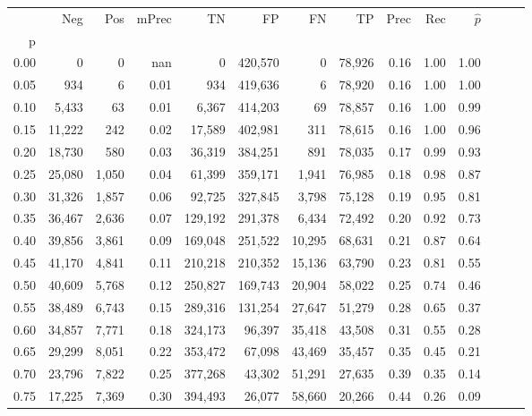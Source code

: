 \begin{tabular}{rrrrrrrrrrrrrr}
\toprule
{} &     Neg &    Pos & mPrec &       TN &       FP &      FN &      TP &  Prec &   Rec & $\hat{p}$ \\
p    &         &        &       &          &          &         &         &       &       &           \\
\midrule
0.00 &       0 &      0 &   nan &        0 &  420,570 &       0 &  78,926 &  0.16 &  1.00 &      1.00 \\
0.05 &     934 &      6 &  0.01 &      934 &  419,636 &       6 &  78,920 &  0.16 &  1.00 &      1.00 \\
0.10 &   5,433 &     63 &  0.01 &    6,367 &  414,203 &      69 &  78,857 &  0.16 &  1.00 &      0.99 \\
0.15 &  11,222 &    242 &  0.02 &   17,589 &  402,981 &     311 &  78,615 &  0.16 &  1.00 &      0.96 \\
0.20 &  18,730 &    580 &  0.03 &   36,319 &  384,251 &     891 &  78,035 &  0.17 &  0.99 &      0.93 \\
0.25 &  25,080 &  1,050 &  0.04 &   61,399 &  359,171 &   1,941 &  76,985 &  0.18 &  0.98 &      0.87 \\
0.30 &  31,326 &  1,857 &  0.06 &   92,725 &  327,845 &   3,798 &  75,128 &  0.19 &  0.95 &      0.81 \\
0.35 &  36,467 &  2,636 &  0.07 &  129,192 &  291,378 &   6,434 &  72,492 &  0.20 &  0.92 &      0.73 \\
0.40 &  39,856 &  3,861 &  0.09 &  169,048 &  251,522 &  10,295 &  68,631 &  0.21 &  0.87 &      0.64 \\
0.45 &  41,170 &  4,841 &  0.11 &  210,218 &  210,352 &  15,136 &  63,790 &  0.23 &  0.81 &      0.55 \\
0.50 &  40,609 &  5,768 &  0.12 &  250,827 &  169,743 &  20,904 &  58,022 &  0.25 &  0.74 &      0.46 \\
0.55 &  38,489 &  6,743 &  0.15 &  289,316 &  131,254 &  27,647 &  51,279 &  0.28 &  0.65 &      0.37 \\
0.60 &  34,857 &  7,771 &  0.18 &  324,173 &   96,397 &  35,418 &  43,508 &  0.31 &  0.55 &      0.28 \\
0.65 &  29,299 &  8,051 &  0.22 &  353,472 &   67,098 &  43,469 &  35,457 &  0.35 &  0.45 &      0.21 \\
0.70 &  23,796 &  7,822 &  0.25 &  377,268 &   43,302 &  51,291 &  27,635 &  0.39 &  0.35 &      0.14 \\
0.75 &  17,225 &  7,369 &  0.30 &  394,493 &   26,077 &  58,660 &  20,266 &  0.44 &  0.26 &      0.09 \\

\end{tabular}
